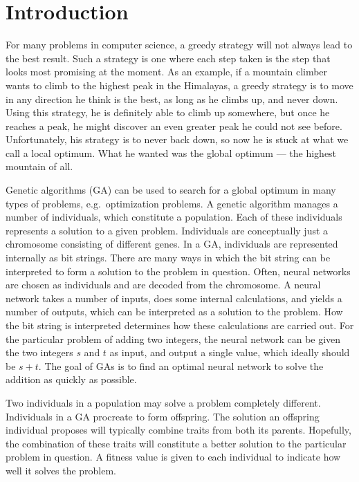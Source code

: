 \section{Introduction}
For many problems in computer science, a greedy strategy will not always lead to the best result. Such a strategy is one where each step taken is the step that looks most promising at the moment. As an example, if a mountain climber wants to climb to the highest peak in the Himalayas, a greedy strategy is to move in any direction he think is the best, as long as he climbs up, and never down. Using this strategy, he is definitely able to climb up somewhere, but once he reaches a peak, he might discover an even greater peak he could not see before. Unfortunately, his strategy is to never back down, so now he is stuck at what we call a local optimum. What he wanted was the global optimum --- the highest mountain of all.
 
Genetic algorithms (GA) can be used to search for a global optimum in many types of problems, e.g.\ optimization problems. A genetic algorithm manages a number of individuals, which constitute a population. Each of these individuals represents a solution to a given problem. Individuals are conceptually just a chromosome consisting of different genes. In a GA, individuals are represented internally as bit strings. There are many ways in which the bit string can be interpreted to form a solution to the problem in question. Often, neural networks are chosen as individuals and are decoded from the chromosome. A neural network takes a number of inputs, does some internal calculations, and yields a number of outputs, which can be interpreted as a solution to the problem. How the bit string is interpreted determines how these calculations are carried out. For the particular problem of adding two integers, the neural network can be given the two integers $s$ and $t$ as input, and output a single value, which ideally should be $s+t$. The goal of GAs is to find an optimal neural network to solve the addition as quickly as possible.

Two individuals in a population may solve a problem completely different.
Individuals in a GA procreate to form offspring. The solution an offspring individual proposes will typically combine traits from both its parents. Hopefully, the combination of these traits will constitute a better solution to the particular problem in question. A fitness value is given to each individual to indicate how well it solves the problem.

